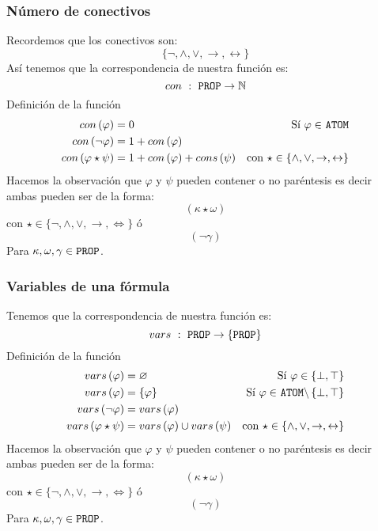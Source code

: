 \documentclass[a4paper]{article}
\begin{document}
\subsubsection{Número de conectivos}
\noindent
Recordemos que los conectivos son:
\[
    \{\neg, \land, \lor, \rightarrow, \leftrightarrow\}  
\]
Así tenemos que la correspondencia de nuestra función es:
\[
      con \ : \ \text{\texttt{PROP}} \to \mathbb{N}
\]
Definición de la función
\begin{align*}
    con\left(\varphi\right) &= 0 &\text{Sí \(\varphi \in\) \texttt{ATOM}} \\
    con\left(\neg \varphi\right) &= 1 + con\left(\varphi\right) & \\
    con\left(\varphi \star \psi \right) &= 1 + con\left(\varphi\right) + cons\left(\psi\right) & \text{con \(\star \in \{ \land, \lor, \rightarrow, \leftrightarrow \}\)} \\
\end{align*}
Hacemos la observación que \(\varphi\) y \(\psi\) pueden contener o no paréntesis es decir ambas pueden ser de la forma:
\[
    \left(\kappa \star \omega \right)  
\]
con \(\star \in \{ \neg, \land, \lor, \rightarrow, \Leftrightarrow \}\) ó
\[
    \left(\neg \gamma\right)
\]
Para \(\kappa, \omega, \gamma \in \text{\texttt{PROP}}\).
\subsubsection{Variables de una fórmula}
Tenemos que la correspondencia de nuestra función es:
\[
      vars \ : \ \text{\texttt{PROP}} \to \{\text{\texttt{PROP}}\}
\]
Definición de la función
\begin{align*}
    vars\left(\varphi\right) &= \varnothing &\text{Sí \(\varphi \in \left\{\bot, \top\right\}\)} \\
    vars\left(\varphi\right) &= \{ \varphi \} &\text{Sí \(\varphi \in\) \texttt{ATOM\(\setminus \left\{\bot, \top\right\}\)}} \\
    vars\left(\neg \varphi\right) &= vars\left(\varphi\right) & \\
    vars\left(\varphi \star \psi \right) &= vars\left(\varphi\right) \cup vars\left(\psi\right) & \text{con \(\star \in \{ \land, \lor, \rightarrow, \leftrightarrow \}\)} \\
\end{align*}
Hacemos la observación que \(\varphi\) y \(\psi\) pueden contener o no paréntesis es decir ambas pueden ser de la forma:
\[
    \left(\kappa \star \omega \right)  
\]
con \(\star \in \{ \neg, \land, \lor, \rightarrow, \Leftrightarrow \}\) ó
\[
    \left(\neg \gamma\right)
\]
Para \(\kappa, \omega, \gamma \in \text{\texttt{PROP}}\).
\end{document}
